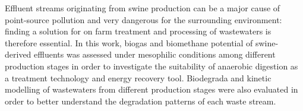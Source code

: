 Effluent streams originating from swine production can be a major cause of point-source pollution and very dangerous for the surrounding environment: finding a solution for on farm treatment and processing of wastewaters is therefore essential. In this work, biogas and biomethane potential of swine-derived effluents was assessed under mesophilic conditions among different production stages in order to investigate the suitability of anaerobic digestion as a treatment technology and energy recovery tool. Biodegrada and kinetic modelling of wastewaters from different production stages were also evaluated in order to better understand the degradation patterns of each waste stream.